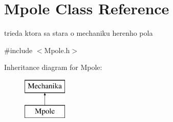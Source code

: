 \hypertarget{class_mpole}{\section{Mpole Class Reference}
\label{class_mpole}
}


trieda ktora sa stara o mechaniku herenho pola  




{\ttfamily \#include $<$Mpole.\-h$>$}

Inheritance diagram for Mpole\-:\begin{figure}[H]
\begin{center}
\leavevmode
\includegraphics[height=2.000000cm]{class_mpole}
\end{center}
\end{figure}
